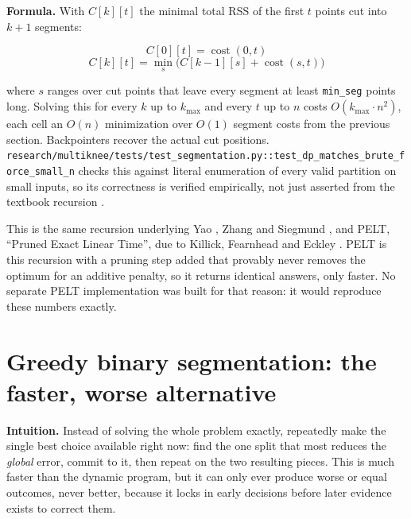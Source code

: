 \documentclass[11pt]{article}
\newcommand{\code}[1]{\texttt{#1}}
\begin{document}
\textbf{Formula.} With $C[k][t]$ the minimal total RSS of the first $t$
points cut into $k+1$ segments:

\begin{equation}
C[0][t] = \operatorname{cost}(0, t)
\end{equation}
\begin{equation}
C[k][t] = \min_{s} \Big( C[k-1][s] + \operatorname{cost}(s, t) \Big)
\end{equation}

where $s$ ranges over cut points that leave every segment at least
\code{min\_seg} points long. Solving this for every $k$ up to $k_{\max}$ and
every $t$ up to $n$ costs $O(k_{\max} \cdot n^2)$, each cell an $O(n)$
minimization over $O(1)$ segment costs from the previous section.
Backpointers recover the actual cut positions.
\code{research/multiknee/tests/test\_segmentation.py::test\_dp\_matches\_brute\_force\_small\_n}
checks this against literal enumeration of every valid partition on small
inputs, so its correctness is verified empirically, not just asserted from
the textbook recursion \citep{cormen2022algorithms,dasgupta2006algorithms}.

This is the same recursion underlying Yao \citeyearpar{yao1988}, Zhang and
Siegmund \citeyearpar{zhangsiegmund2007}, and PELT, ``Pruned Exact Linear
Time'', due to Killick, Fearnhead and Eckley \citeyearpar{killick2012}. PELT
is this recursion with a pruning step added that provably never removes the
optimum for an additive penalty, so it returns identical answers, only
faster. No separate PELT implementation was built for that reason: it would
reproduce these numbers exactly.

\section{Greedy binary segmentation: the faster, worse alternative}

\textbf{Intuition.} Instead of solving the whole problem exactly,
repeatedly make the single best choice available right now: find the one
split that most reduces the \emph{global} error, commit to it, then repeat
on the two resulting pieces. This is much faster than the dynamic program,
but it can only ever produce worse or equal outcomes, never better, because
it locks in early decisions before later evidence exists to correct them.
\end{document}
